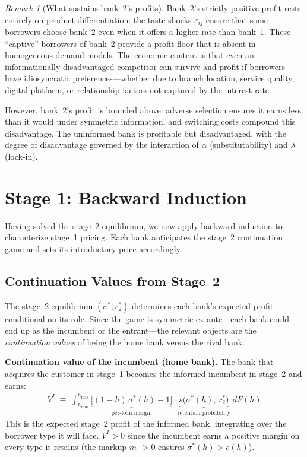 \documentclass[12pt]{article}
\theoremstyle{plain}
\theoremstyle{plain}
\theoremstyle{definition}  %
\theoremstyle{remark}  %
\newtheorem{remark}[thm]{Remark}  %
\begin{document}
\begin{remark}[What sustains bank~2's profits]
Bank~2's strictly positive profit rests entirely on product differentiation: the taste shocks $\varepsilon_{ij}$ ensure that some borrowers choose bank~2 even when it offers a higher rate than bank~1. These ``captive'' borrowers of bank~2 provide a profit floor that is absent in homogeneous-demand models. The economic content is that even an informationally disadvantaged competitor can survive and profit if borrowers have idiosyncratic preferences---whether due to branch location, service quality, digital platform, or relationship factors not captured by the interest rate.

However, bank~2's profit is bounded above: adverse selection ensures it earns less than it would under symmetric information, and switching costs compound this disadvantage. The uninformed bank is profitable but disadvantaged, with the degree of disadvantage governed by the interaction of $\alpha$ (substitutability) and $\lambda$ (lock-in).
\end{remark}



\newpage
\section{Stage 1: Backward Induction}\label{sec:stage1}

Having solved the stage~2 equilibrium, we now apply backward induction to characterize stage~1 pricing. Each bank anticipates the stage~2 continuation game and sets its introductory price accordingly.

\subsection{Continuation Values from Stage~2}

The stage~2 equilibrium $(\sigma^*, r_2^*)$ determines each bank's expected profit conditional on its role. Since the game is symmetric ex ante---each bank could end up as the incumbent or the entrant---the relevant objects are the \emph{continuation values} of being the home bank versus the rival bank.

\medskip\noindent
\textbf{Continuation value of the incumbent (home bank).} The bank that acquires the customer in stage~1 becomes the informed incumbent in stage~2 and earns:
\begin{align}\label{eq:V_I}
    V^{I} \;\equiv\; \int_{h_{\min}}^{h_{\max}} \underbrace{\big[(1-h)\,\sigma^*(h) - 1\big]}_{\text{per-loan margin}} \cdot \underbrace{s\!\big(\sigma^*(h),\, r_2^*\big)}_{\text{retention probability}} \; dF(h)
\end{align}
This is the expected stage~2 profit of the informed bank, integrating over the borrower type it will face. $V^I > 0$ since the incumbent earns a positive margin on every type it retains (the markup $m_1 > 0$ ensures $\sigma^*(h) > c(h)$).
\end{document}
